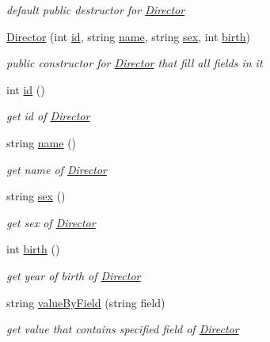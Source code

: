 \begin{DoxyCompactItemize}
\begin{DoxyCompactList}\small\item\em default public destructor for \hyperlink{classDirector}{Director} \end{DoxyCompactList}\item 
\hyperlink{classDirector_a07ca04311c3027c29faf95611a0b159e}{Director} (int \hyperlink{classDirector_ab30236842e47649db9900267d21e0860}{id}, string \hyperlink{classDirector_a96a8bc5db717ab2b5613dc726d0c76b2}{name}, string \hyperlink{classDirector_a0b63de2353e9b872e60d7f67d2a2c9d7}{sex}, int \hyperlink{classDirector_af8af9461369153fb6881a8e0e8dbe3e1}{birth})
\begin{DoxyCompactList}\small\item\em public constructor for \hyperlink{classDirector}{Director} that fill all fields in it \end{DoxyCompactList}\item 
int \hyperlink{classDirector_ab30236842e47649db9900267d21e0860}{id} ()
\begin{DoxyCompactList}\small\item\em get id of \hyperlink{classDirector}{Director} \end{DoxyCompactList}\item 
string \hyperlink{classDirector_a96a8bc5db717ab2b5613dc726d0c76b2}{name} ()
\begin{DoxyCompactList}\small\item\em get name of \hyperlink{classDirector}{Director} \end{DoxyCompactList}\item 
string \hyperlink{classDirector_a0b63de2353e9b872e60d7f67d2a2c9d7}{sex} ()
\begin{DoxyCompactList}\small\item\em get sex of \hyperlink{classDirector}{Director} \end{DoxyCompactList}\item 
int \hyperlink{classDirector_af8af9461369153fb6881a8e0e8dbe3e1}{birth} ()
\begin{DoxyCompactList}\small\item\em get year of birth of \hyperlink{classDirector}{Director} \end{DoxyCompactList}\item 
string \hyperlink{classDirector_a731f780e06cb1b0bfcbfa14b2c85b00a}{value\+By\+Field} (string field)
\begin{DoxyCompactList}\small\item\em get value that contains specified field of \hyperlink{classDirector}{Director} \end{DoxyCompactList}\end{DoxyCompactItemize}


